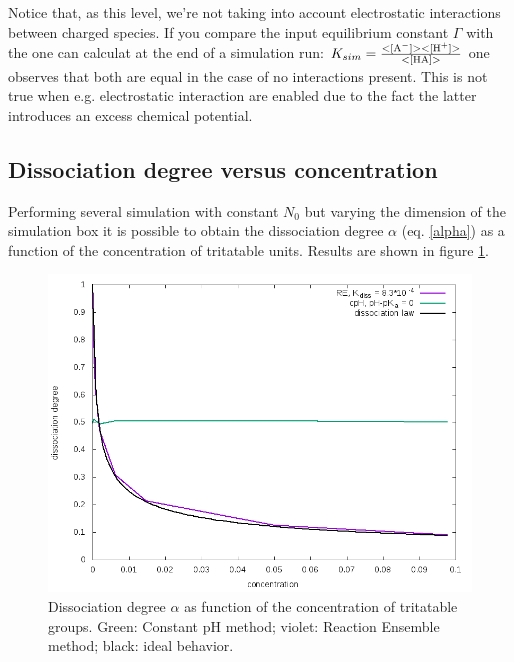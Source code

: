 \documentclass[
a4paper,                        %
11pt,                           %
twoside,                        %
footsepline,                    %
headsepline,                    %
headexclude,                    %
footexclude,                    %
pagesize,                       %
]{scrartcl}
\begin{document}
Notice that, as this level, we're not taking into account electrostatic interactions between charged species. If  you compare the input equilibrium constant $\Gamma$ with the one can calculat at the end of a simulation run: $K_{sim} = \frac{<[\ce{A-}]><[\ce{H+}]>}{<[\ce{HA}]>}$ one observes that both are equal in the case of no interactions present. This is not true when e.g. electrostatic interaction are enabled due to the fact the latter introduces an excess chemical potential.


\subsection{Dissociation degree versus concentration}

Performing several simulation with constant $N_0$ but varying the dimension of the simulation box it is possible to obtain the dissociation degree $\alpha$ (eq. \ref{alpha}) as a function of the concentration of tritatable units. Results are shown in figure \ref{alpha_vs_C}.

\begin{figure}[tb]
	\centering
 	\includegraphics[scale=0.5]{figures/alpha_vs_C.png}
 	\caption{Dissociation degree $\alpha$ as function of the concentration of tritatable groups. Green: Constant pH method; violet: Reaction Ensemble method; black: ideal behavior.}
 	\label{alpha_vs_C}
\end{figure}
\end{document}
